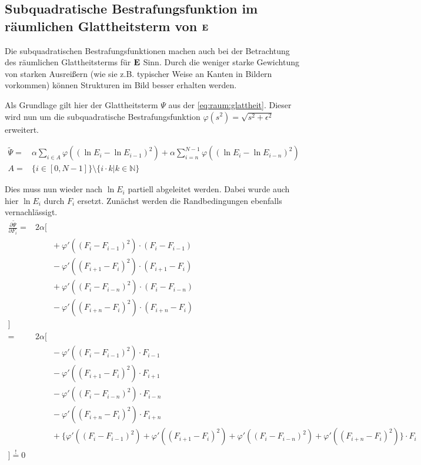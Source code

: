 \subsection{Subquadratische Bestrafungsfunktion im räumlichen Glattheitsterm von $\mathbf E$}
\label{subsec:robust:e:raum}
Die subquadratischen Bestrafungsfunktionen machen auch bei der Betrachtung des räumlichen Glattheitsterms für $\mathbf E$ 
Sinn. Durch die weniger starke Gewichtung von starken Ausreißern (wie sie z.B. typischer Weise an Kanten in Bildern vorkommen) können Strukturen im Bild besser erhalten werden.

Als Grundlage gilt hier der Glattheitsterm $\Psi$ aus der \autoref{eq:raum:glattheit}. Dieser wird nun um die subquadratische Bestrafungsfunktion $\varphi(s^2) = \sqrt{s^2+\epsilon^2}$ erweitert.

\begin{align}
\label{eq:robust:raum}
\tilde{\Psi} =& 
        \alpha \sum_{i\in A}
            \varphi((\ln E_i - \ln E_{i-1})^2)
        +\alpha \sum_{i=n}^{N-1}\varphi((\ln E_i - \ln E_{i-n})^2)
    \\
    A=& \{ i \in [0,N-1]\} \setminus \{ i \cdot k | k \in \mathbb{N} \}
\end{align}

Dies muss nun wieder nach $\ln E_i$ partiell abgeleitet werden. Dabei wurde auch hier $\ln E_i$ durch $F_i$ ersetzt. Zunächst werden die Randbedingungen ebenfalls vernachlässigt.
\begin{align}
\frac{\partial \tilde \Psi}{\partial F_i} =& 2\alpha[ \nonumber\\
    & \qquad + \varphi'((F_i - F_{i-1})^2)     \cdot (F_i - F_{i-1}) \nonumber\\
    & \qquad - \varphi'((F_{i+1} - F_{i})^2)   \cdot (F_{i+1} - F_i) \nonumber\\
    & \qquad + \varphi'((F_i - F_{i-n})^2)     \cdot (F_i - F_{i-n})\nonumber\\
    & \qquad - \varphi'((F_{i+n} - F_{i})^2)   \cdot (F_{i+n}- F_i)\nonumber\\
    ]\\
=& 2\alpha[ \nonumber\\
    & \qquad - \varphi'((F_i - F_{i-1})^2)     \cdot F_{i-1} \nonumber\\
    & \qquad - \varphi'((F_{i+1} - F_{i})^2)   \cdot F_{i+1} \nonumber\\
    & \qquad - \varphi'((F_i - F_{i-n})^2)     \cdot F_{i-n} \nonumber\\
    & \qquad - \varphi'((F_{i+n} - F_{i})^2)   \cdot F_{i+n} \nonumber\\
    & \qquad + \{\varphi'((F_i - F_{i-1})^2) + \varphi'((F_{i+1} - F_{i})^2) +\varphi'((F_i - F_{i-n})^2) + \varphi'((F_{i+n} - F_{i})^2)\} \cdot F_i \nonumber\\
    ] \overset{!}{=} 0
\end{align}

